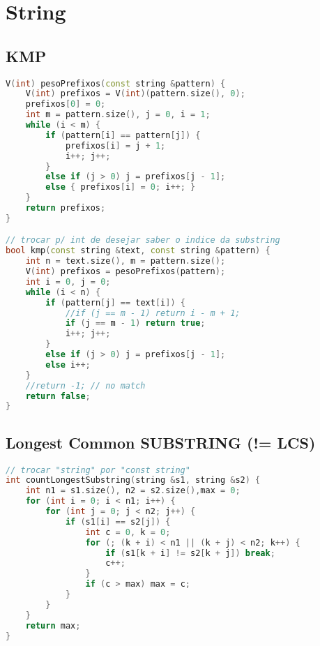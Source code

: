 \chapter{String}




\section{KMP}
\begin{lstlisting}[language=C++]
V(int) pesoPrefixos(const string &pattern) {
    V(int) prefixos = V(int)(pattern.size(), 0);
    prefixos[0] = 0;
    int m = pattern.size(), j = 0, i = 1;
    while (i < m) {
        if (pattern[i] == pattern[j]) {
            prefixos[i] = j + 1;
            i++; j++;
        }
        else if (j > 0) j = prefixos[j - 1];
        else { prefixos[i] = 0; i++; }
    }
    return prefixos;
}

// trocar p/ int de desejar saber o indice da substring
bool kmp(const string &text, const string &pattern) {
    int n = text.size(), m = pattern.size();
    V(int) prefixos = pesoPrefixos(pattern);
    int i = 0, j = 0;
    while (i < n) {
        if (pattern[j] == text[i]) {
            //if (j == m - 1) return i - m + 1;
            if (j == m - 1) return true;
            i++; j++;
        }
        else if (j > 0) j = prefixos[j - 1];
        else i++;
    }
    //return -1; // no match
    return false;
}
\end{lstlisting}

\section{Longest Common SUBSTRING (!= LCS)}
\begin{lstlisting}[language=C++]
// trocar "string" por "const string"
int countLongestSubstring(string &s1, string &s2) {
    int n1 = s1.size(), n2 = s2.size(),max = 0;
    for (int i = 0; i < n1; i++) {
        for (int j = 0; j < n2; j++) {
            if (s1[i] == s2[j]) {
                int c = 0, k = 0;
                for (; (k + i) < n1 || (k + j) < n2; k++) {
                    if (s1[k + i] != s2[k + j]) break;
                    c++;
                }
                if (c > max) max = c;
            }
        }
    }
    return max;
}
\end{lstlisting}

